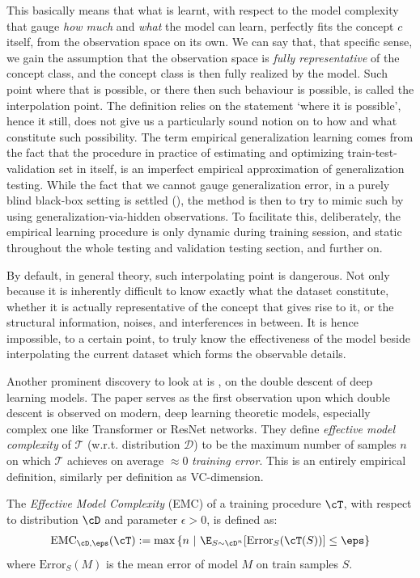 \documentclass[
  journal=largetwo,
  year=2025,
  volume=37,
]{cup-journal}
\begin{document}
This basically means that what is learnt, with respect to the model complexity that gauge \textit{how much} and \textit{what} the model can learn, perfectly fits the concept $c$ itself, from the observation space on its own. We can say that, that specific sense, we gain the assumption that the observation space is \textit{fully representative} of the concept class, and the concept class is then fully realized by the model. Such point where that is possible, or there then such behaviour is possible, is called the interpolation point. The definition relies on the statement `where it is possible', hence it still, does not give us a particularly sound notion on to how and what constitute such possibility. The term empirical generalization learning comes from the fact that the procedure in practice of estimating and optimizing train-test-validation set in itself, is an imperfect empirical approximation of generalization testing. While the fact that we cannot gauge generalization error, in a purely blind black-box setting is settled (\cite{10.5555/2371238,10.5555/2930837,10.5555/2621980}), the method is then to try to mimic such by using generalization-via-hidden observations. To facilitate this, deliberately, the empirical learning procedure is only dynamic during training session, and static throughout the whole testing and validation testing section, and further on. 

By default, in general theory, such interpolating point is dangerous. Not only because it is inherently difficult to know exactly what the dataset constitute, whether it is actually representative of the concept that gives rise to it, or the structural information, noises, and interferences in between. It is hence impossible, to a certain point, to truly know the effectiveness of the model beside interpolating the current dataset which forms the observable details. 

Another prominent discovery to look at is \cite{nakkiran_deep_2019}, on the double descent of deep learning models. The paper serves as the first observation upon which double descent is observed on modern, deep learning theoretic models, especially complex one like Transformer or ResNet networks. They define \emph{effective model complexity} of $\mathcal{T}$ (w.r.t. distribution $\mathcal D$) to be the maximum number of samples $n$ on which $\mathcal{T}$ achieves on average $\approx 0$ \emph{training error}. This is an entirely empirical definition, similarly per definition as VC-dimension. 

\newcommand{\EMC}{\mathrm{EMC}}
\begin{definition}
The \emph{Effective Model Complexity} (EMC) of a training procedure $\cT$, with respect to distribution $\cD$ and parameter $\epsilon>0$,
is defined as:
\begin{align*}
    \EMC_{\cD,\eps}(\cT)
    :=  \max \left\{n ~|~ \E_{S \sim \cD^n}[ \mathrm{Error}_S( \cT( S )  ) ] \leq \eps \right\}
    \end{align*}
    where $\mathrm{Error}_S(M)$ is the mean error of model $M$ on train samples $S$.
\end{definition}
\end{document}
